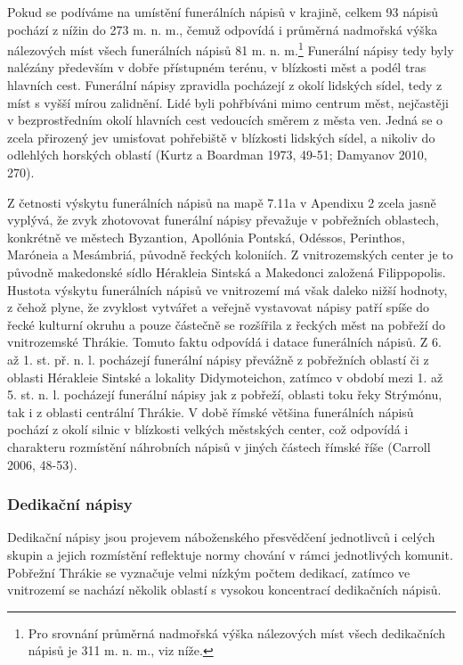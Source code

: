 Pokud se podíváme na umístění funerálních nápisů v krajině, celkem 93  nápisů pochází z nížin do 273 m. n. m., čemuž odpovídá i průměrná nadmořská výška nálezových míst všech funerálních nápisů 81 m. n. m.\footnote{Pro srovnání průměrná nadmořská výška nálezových míst všech dedikačních nápisů je 311 m. n. m., viz níže.} Funerální nápisy tedy byly nalézány především v dobře přístupném terénu, v blízkosti měst a podél tras hlavních cest. Funerální nápisy zpravidla pocházejí z okolí lidských sídel, tedy z míst s vyšší mírou zalidnění. Lidé byli pohřbíváni mimo centrum měst, nejčastěji v bezprostředním okolí hlavních cest vedoucích směrem z města ven. Jedná se o zcela přirozený jev umisťovat pohřebiště v blízkosti lidských sídel, a nikoliv do odlehlých horských oblastí (Kurtz a Boardman 1973, 49-51; Damyanov 2010, 270).

Z četnosti výskytu funerálních nápisů na mapě 7.11a v Apendixu 2 zcela jasně vyplývá, že zvyk zhotovovat funerální nápisy převažuje v pobřežních oblastech, konkrétně ve městech Byzantion, Apollónia Pontská, Odéssos, Perinthos, Maróneia a Mesámbriá, původně řeckých koloniích. Z vnitrozemských center je to původně makedonské sídlo Hérakleia Sintská a Makedonci založená Filippopolis. Hustota výskytu funerálních nápisů ve vnitrozemí má však daleko nižší hodnoty, z čehož plyne, že zvyklost vytvářet a veřejně vystavovat nápisy patří spíše do řecké kulturní okruhu a pouze částečně se rozšířila z řeckých měst na pobřeží do vnitrozemské Thrákie. Tomuto faktu odpovídá i datace funerálních nápisů. Z 6. až 1. st. př. n. l. pocházejí funerální nápisy převážně z pobřežních oblastí či z oblasti Hérakleie Sintské a lokality Didymoteichon, zatímco v období mezi 1. až 5. st. n. l. pocházejí funerální nápisy jak z pobřeží, oblasti toku řeky Strýmónu, tak i z oblasti centrální Thrákie. V době římské většina funerálních nápisů pochází z okolí silnic v blízkosti velkých městských center, což odpovídá i charakteru rozmístění náhrobních nápisů v jiných částech římské říše (Carroll 2006, 48-53).

\subsubsection[dedikační-nápisy-19]{Dedikační nápisy}

Dedikační nápisy jsou projevem náboženského přesvědčení jednotlivců i celých skupin a jejich rozmístění reflektuje normy chování v rámci jednotlivých komunit. Pobřežní Thrákie se vyznačuje velmi nízkým počtem dedikací, zatímco ve vnitrozemí se nachází několik oblastí s vysokou koncentrací dedikačních nápisů.

